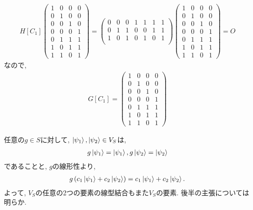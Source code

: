 \begin{ex}
    \label{ex10.28}
    \begin{align*}
        H[C_1]
        \begin{pmatrix}
            1 & 0 & 0 & 0 \\
            0 & 1 & 0 & 0 \\
            0 & 0 & 1 & 0 \\
            0 & 0 & 0 & 1 \\
            0 & 1 & 1 & 1 \\
            1 & 0 & 1 & 1 \\
            1 & 1 & 0 & 1
        \end{pmatrix}
        =
        \begin{pmatrix}
            0 & 0 & 0 & 1 & 1 & 1 & 1 \\
            0 & 1 & 1 & 0 & 0 & 1 & 1 \\
            1 & 0 & 1 & 0 & 1 & 0 & 1 \\
        \end{pmatrix}
        \begin{pmatrix}
            1 & 0 & 0 & 0 \\
            0 & 1 & 0 & 0 \\
            0 & 0 & 1 & 0 \\
            0 & 0 & 0 & 1 \\
            0 & 1 & 1 & 1 \\
            1 & 0 & 1 & 1 \\
            1 & 1 & 0 & 1
        \end{pmatrix}
        =
        O
    \end{align*}
    なので,
    \begin{align*}
        G [ C_1]
        =
        \begin{pmatrix}
            1 & 0 & 0 & 0 \\
            0 & 1 & 0 & 0 \\
            0 & 0 & 1 & 0 \\
            0 & 0 & 0 & 1 \\
            0 & 1 & 1 & 1 \\
            1 & 0 & 1 & 1 \\
            1 & 1 & 0 & 1
        \end{pmatrix}
    \end{align*}
\end{ex}

\begin{ex}
    \label{ex10.29}
    任意の$g \in S$に対して, $\ket{\psi_1}, \ket{\psi_2} \in V_S$は,
    \begin{align*}
        g \ket{\psi_1} = \ket{\psi_1}, g \ket{\psi_2} = \ket{\psi_2}
    \end{align*}
    であることと, $g$の線形性より,
    \begin{align*}
        g \left( c_1 \ket{\psi_1} + c_2 \ket{\psi_2}\right) = c_1 \ket{\psi_1} + c_2 \ket{\psi_2}.
    \end{align*}
    よって, $V_S$の任意の2つの要素の線型結合もまた$V_S$の要素. 後半の主張については明らか.
\end{ex}

